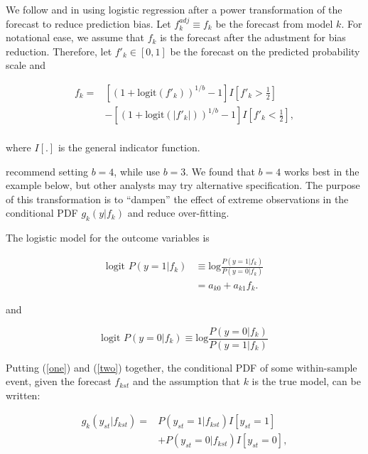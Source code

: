 \documentclass[pdftex,12pt,fullpage,oneside]{amsart}
\begin{document}
We follow \citet{Sloughter:2007} and \citet{Hamill:2004} in using
logistic regression after a power transformation of the forecast to
reduce prediction bias. Let $f_k^{adj} \equiv f_k$ be the forecast
from model $k$. For notational ease, we assume that $f_k$ is the
forecast after the adustment for bias reduction.  Therefore, let
$f'_k \in [0,1]$ be the forecast on the predicted probability scale
 and

\begin{equation}
\begin{array}{rl}
f_k = & \left[(1+\mbox{logit}(f'_k))^{1/b} - 1\right]I\left[f'_k>\frac{1}{2}\right] \\
& - \left[(1+\mbox{logit}(|f'_k|))^{1/b} -  1\right]I\left[f'_k<\frac{1}{2}\right],\\
\end{array}
 \end{equation}

\noindent where $I[.]$ is the general indicator function.

\citet{Hamill:2004} recommend setting $b=4$, while
\citet{Sloughter:2007} use $b=3$.  We found that $b=4$ works best in
the example below, but other analysts may try alternative
specification.  The purpose of this transformation is to ``dampen''
the effect of extreme observations in the conditional PDF $g_k(y|f_k)$
and reduce over-fitting.

The logistic model for the outcome variables is

\begin{equation}
\label{one}
\begin{array}{ll}
\mbox{logit } P(y=1|f_k) & \equiv
\mbox{log}\frac{P(y=1|f_k)}{P(y=0|f_k)}\\
& = a_{k0}+a_{k1}f_k .\end{array}
\end{equation}

\noindent and

\begin{equation}
\label{two}
\mbox{logit } P(y=0|f_k) \equiv
\mbox{log}\frac{P(y=0|f_k)}{P(y=1|f_k)}
\end{equation}

\noindent Putting (\ref{one}) and (\ref{two}) together, the
conditional PDF of some within-sample event, given the forecast
$f_{kst}$ and the assumption that $k$ is the true model, can be
written:

\begin{equation}
\label{component-eq}
\begin{array}{rl}
g_k(y_{st}|f_{kst}) = &P(y_{st}=1|f_{kst})I[y_{st}=1]  \\ 
                    &+ P(y_{st}=0|f_{kst})I[y_{st}=0],
\end{array}
\end{equation}
\end{document}
